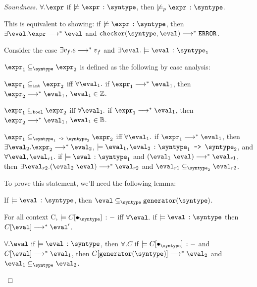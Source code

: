 \begin{proof}[Soundness]
  $\forall. \expr$ if $\not\models \hastype{\expr}{\syntype}$, then $\not\models_p \hastype{\expr}{\syntype}$.

  This is equivalent to showing: if $\not\models \hastype{\expr}{\syntype}$, then $\exists \eval. \expr \smallsteps[] \eval$ and $\mkche{\syntype}{\eval} \smallsteps[] \eerror$.

  Consider the case $\exists v_f. e \smallsteps[] v_f$ and $\exists \eval. \models \hastype{\eval}{\syntype_1}$

  \begin{definition}
    $\expr_1 \subseteq_{\syntype} \expr_2$ is defined as the following by case analysis:

    $\expr_1 \subseteq_{\tint} \expr_2$ iff $\forall \eval_1.$ if $\expr_1 \smallsteps[] \eval_1$, then $\expr_2 \smallsteps[] \eval_1$, $\eval_1 \in \mathbb{Z}$.

    $\expr_1 \subseteq_{\tbool} \expr_2$ iff $\forall \eval_1.$ if $\expr_1 \smallsteps[] \eval_1$, then $\expr_2 \smallsteps[] \eval_1$, $\eval_1 \in \mathbb{B}$.

    $\expr_1 \subseteq_{\mkfun{\syntype_1}{\syntype_2}} \expr_2$ iff $\forall \eval_1.$ if $\expr_1 \smallsteps[] \eval_1$, then $\exists \eval_2. \expr_2 \smallsteps[] \eval_2$, $\models \hastype{\eval_1, \eval_2}{\mkfun{\syntype_1}{\syntype_2}}$, and $\forall \eval, \eval_{r1}.$ if $\models \hastype{\eval}{\syntype_1}$ and $(\eval_1 \ \eval) \smallsteps[] \eval_{r1}$, then $\exists \eval_{r2}. (\eval_2 \ \eval) \smallsteps[] \eval_{r2}$ and $\eval_{r1} \subseteq_{\syntype_2} \eval_{r2}$.

  \end{definition}

  To prove this statement, we'll need the following lemma:

  \begin{lemma}
    If $\models \hastype{\eval}{\syntype}$, then $\eval \subseteq_{\syntype} \mkgen{\syntype}$.
  \end{lemma}

  \begin{definition}
    For all context C, $\models \hastype{C[\bullet_{\syntype}]}{-}$ iff $\forall \eval.$ if $\models \hastype{\eval}{\syntype}$ then $C[\eval] \smallsteps[] \eval'$.
  \end{definition}

  \begin{lemma}
    $\forall. \eval$ if $\models \hastype{\eval}{\syntype}$, then $\forall. C$ if $\models \hastype{C[\bullet_{\syntype}]}{-}$ and $C[\eval] \smallsteps[] \eval_1$, then $C[\mkgen{\syntype}] \smallsteps[] \eval_2$ and $\eval_1 \subseteq_{\syntype} \eval_2$.
  \end{lemma}

\end{proof}

